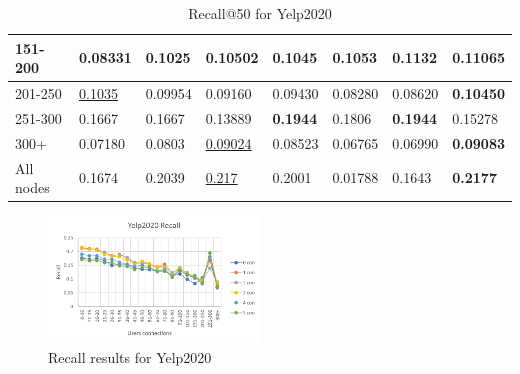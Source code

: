 \begin{table}[h!]
\begin{tabular}{|l|l|l|l|l|l|l||l|}
        151-200     & 0.08331                        & 0.1025                         & 0.10502                        & 0.1045                         & 0.1053                         & \textbf{0.1132}                 & 0.11065                    \\ \hline
        201-250     & \underline{0.1035}             & 0.09954                        & 0.09160                        & 0.09430                        & 0.08280                        & 0.08620                         & \textbf{0.10450}           \\ \hline
        251-300     & 0.1667                         & 0.1667                         & 0.13889                        & \textbf{0.1944}                & 0.1806                         & \textbf{0.1944}                 & 0.15278                    \\ \hline
        300+        & 0.07180                        & 0.0803                         & \underline{0.09024}            & 0.08523                        & 0.06765                        & 0.06990                         & \textbf{0.09083}           \\ \hline
        All nodes   & 0.1674                         & 0.2039                         & \underline{0.217}              & 0.2001                         & 0.01788                        & 0.1643                          & \textbf{0.2177}            \\ \hline
    \end{tabular}
    \caption{Recall@50 for Yelp2020}
    \label{tab:yelp2020-recall-evaluation}
\end{table}

\begin{figure}[h!]
    \includegraphics[width=0.5\textwidth]{figures/evaluation/yelp-recall-evaluation.png}
    \centering
    \caption{Recall results for Yelp2020}
    \label{fig:recall-yelp2020-individual-embedding-evaluation}
\end{figure}

